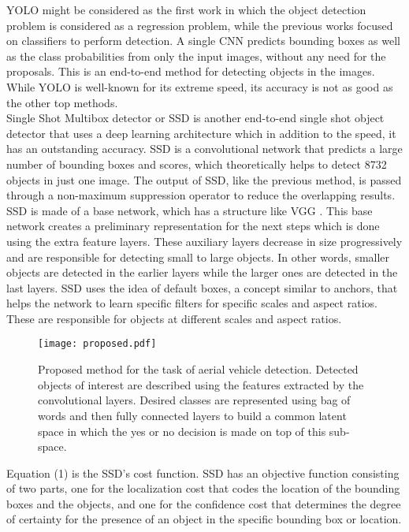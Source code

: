 \documentclass[conference]{IEEEtran}
\begin{document}
YOLO \cite{yolo} might be considered as the first work in which the object detection problem is considered as a regression problem, while the previous works focused on classifiers to perform detection. A single CNN predicts bounding boxes as well as the class probabilities from only the input images, without any need for the proposals. This is an end-to-end method for detecting objects in the images. While YOLO is well-known for its extreme speed, its accuracy is not as good as the other top methods.\\

Single Shot Multibox detector or SSD \cite{ssd} is another end-to-end single shot object detector that uses a deep learning architecture which in addition to the speed, it has an outstanding accuracy. SSD is a convolutional network that predicts a large number of bounding boxes and scores, which theoretically helps to detect 8732 objects in just one image. The output of SSD, like the previous method, is passed through a non-maximum suppression operator to reduce the overlapping results. SSD is made of a base network, which has a structure like VGG \cite{vgg}. This base network creates a preliminary representation for the next steps which is done using the extra feature layers. These auxiliary layers decrease in size progressively and are responsible for detecting small to large objects. In other words, smaller objects are detected in the earlier layers while the larger ones are detected in the last layers. SSD uses the idea of default boxes, a concept similar to anchors, that helps the network to learn specific filters for specific scales and aspect ratios. These are responsible for objects at different scales and aspect ratios.

\begin{figure*}[!t]
\centering
\texttt{[image: proposed.pdf]}\\
\caption{Proposed method for the task of aerial vehicle detection. Detected objects of interest are described using the features extracted by the convolutional layers. Desired classes are represented using bag of words and then fully connected layers to build a common latent space in which the yes or no decision is made on top of this sub-space.}
\label{fig_graph3}
\end{figure*}

Equation (1) is the SSD's cost function. SSD has an objective function consisting of two parts, one for the localization cost that codes the location of the bounding boxes and the objects, and one for the confidence cost that determines the degree of certainty for the presence of an object in the specific bounding box or location. 
\end{document}
